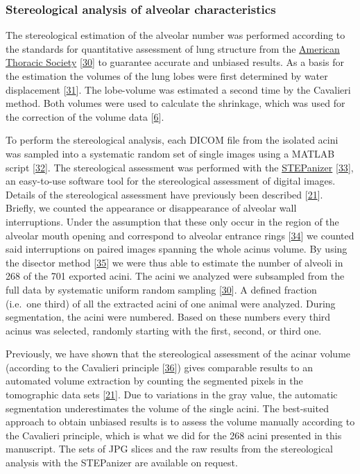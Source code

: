 \documentclass[
  american,
]{article}
\begin{document}
\hypertarget{stereological-analysis-of-alveolar-characteristics}{%
\subsubsection{Stereological analysis of alveolar characteristics}\label{stereological-analysis-of-alveolar-characteristics}}

The stereological estimation of the alveolar number was performed according to the standards for quantitative assessment of lung structure from the \href{http://www.thoracic.org/}{American Thoracic Society} {[}\protect\hyperlink{ref-dNc8FfNn}{30}{]} to guarantee accurate and unbiased results.
As a basis for the estimation the volumes of the lung lobes were first determined by water displacement {[}\protect\hyperlink{ref-KGbSQovR}{31}{]}.
The lobe-volume was estimated a second time by the Cavalieri method.
Both volumes were used to calculate the shrinkage, which was used for the correction of the volume data {[}\protect\hyperlink{ref-wnl86DEM}{6}{]}.

To perform the stereological analysis, each DICOM file from the isolated acini was sampled into a systematic random set of single images using a MATLAB script {[}\protect\hyperlink{ref-12Z2YPzm8}{32}{]}.
The stereological assessment was performed with the \href{http://stepanizer.com/}{STEPanizer} {[}\protect\hyperlink{ref-nPoQ2EIB}{33}{]}, an easy-to-use software tool for the stereological assessment of digital images.
Details of the stereological assessment have previously been described {[}\protect\hyperlink{ref-7YLeeyu}{21}{]}.
Briefly, we counted the appearance or disappearance of alveolar wall interruptions.
Under the assumption that these only occur in the region of the alveolar mouth opening and correspond to alveolar entrance rings {[}\protect\hyperlink{ref-QiAxY2i3}{34}{]} we counted said interruptions on paired images spanning the whole acinus volume.
By using the disector method {[}\protect\hyperlink{ref-FJ9FoB4m}{35}{]} we were thus able to estimate the number of alveoli in 268 of the 701 exported acini.
The acini we analyzed were subsampled from the full data by systematic uniform random sampling {[}\protect\hyperlink{ref-dNc8FfNn}{30}{]}.
A defined fraction (i.e.~one third) of all the extracted acini of one animal were analyzed.
During segmentation, the acini were numbered.
Based on these numbers every third acinus was selected, randomly starting with the first, second, or third one.

Previously, we have shown that the stereological assessment of the acinar volume (according to the Cavalieri principle {[}\protect\hyperlink{ref-FE9HLB4f}{36}{]}) gives comparable results to an automated volume extraction by counting the segmented pixels in the tomographic data sets {[}\protect\hyperlink{ref-7YLeeyu}{21}{]}.
Due to variations in the gray value, the automatic segmentation underestimates the volume of the single acini.
The best-suited approach to obtain unbiased results is to assess the volume manually according to the Cavalieri principle, which is what we did for the 268 acini presented in this manuscript.
The sets of JPG slices and the raw results from the stereological analysis with the STEPanizer are available on request.
\end{document}
